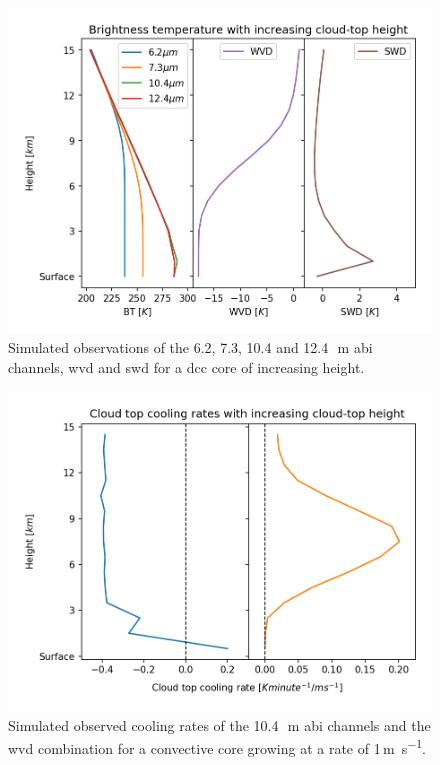\begin{figure}[t]
    \includegraphics[width=\textwidth]{figures/chapter1_06.png}
    \caption[
    Simulated observations of the 6.2, 7.3, 10.4 and 12.4\,\unit{\mu m} \acrshort{abi} channels, \acrshort{wvd} and \acrshort{swd} for a \acrshort{dcc} core of increasing height
    ]{
    Simulated observations of the 6.2, 7.3, 10.4 and 12.4\,\unit{\mu m} \acrshort{abi} channels, \acrshort{wvd} and \acrshort{swd} for a \acrshort{dcc} core of increasing height.
    }
    \label{fig:cloud_height_channels}
\end{figure}

\begin{figure}[t]
    \includegraphics[width=\textwidth]{figures/chapter1_07.png}
    \caption[
    Simulated observed cooling rates of the 10.4\,\unit{\mu m} \acrshort{abi} channels and the \acrshort{wvd} combination for a convective core growing at a rate of 1\,\unit{m s^{-1}}
    ]{
    Simulated observed cooling rates of the 10.4\,\unit{\mu m} \acrshort{abi} channels and the \acrshort{wvd} combination for a convective core growing at a rate of 1\,\unit{m s^{-1}}.
    }
    \label{fig:cloud_height_cooling_rates}
\end{figure}


